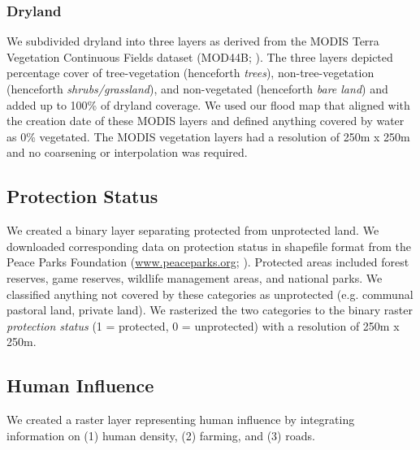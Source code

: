 \documentclass[abstract=off,10pt,a4paper,bibliography=totocnumbered]{article}
\begin{document}
\subsubsection{Dryland}
We subdivided dryland into three layers as derived from the MODIS Terra
Vegetation Continuous Fields dataset (MOD44B; \citealp{Dimiceli.2015}). The
three layers depicted percentage cover of tree-vegetation (henceforth
\textit{trees}), non-tree-vegetation (henceforth \textit{shrubs/grassland}), and
non-vegetated (henceforth \textit{bare land}) and added up to 100\% of dryland
coverage. We used our flood map that aligned with the creation date of these
MODIS layers and defined anything covered by water as 0\% vegetated. The MODIS
vegetation layers had a resolution of 250m x 250m and no coarsening or
interpolation was required.

\subsection{Protection Status}
We created a binary layer separating protected from unprotected land. We
downloaded corresponding data on protection status in shapefile format from the
Peace Parks Foundation (\url{www.peaceparks.org}; \citealp{PeaceParks.2019}).
Protected areas included forest reserves, game reserves, wildlife management
areas, and national parks. We classified anything not covered by these
categories as unprotected (e.g. communal pastoral land, private land). We
rasterized the two categories to the binary raster \textit{protection status} (1
= protected, 0 = unprotected) with a resolution of 250m x 250m.

\subsection{Human Influence}
We created a raster layer representing human influence by integrating
information on (1) human density, (2) farming, and (3) roads.
\end{document}
